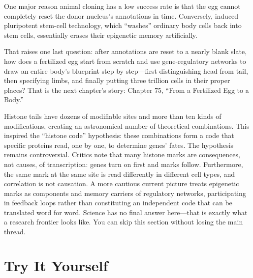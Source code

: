 One major reason animal cloning has a low success rate is that the egg cannot completely reset the donor nucleus's annotations in time. Conversely, induced pluripotent stem-cell technology, which ``washes'' ordinary body cells back into stem cells, essentially erases their epigenetic memory artificially.

That raises one last question: after annotations are reset to a nearly blank slate, how does a fertilized egg start from scratch and use gene-regulatory networks to draw an entire body's blueprint step by step---first distinguishing head from tail, then specifying limbs, and finally putting three trillion cells in their proper places? That is the next chapter's story: Chapter 75, ``From a Fertilized Egg to a Body.''

\begin{tiaozhan}
Histone tails have dozens of modifiable sites and more than ten kinds of modifications, creating an astronomical number of theoretical combinations. This inspired the ``histone code'' hypothesis: these combinations form a code that specific proteins read, one by one, to determine genes' fates. The hypothesis remains controversial. Critics note that many histone marks are consequences, not causes, of transcription: genes turn on first and marks follow. Furthermore, the same mark at the same site is read differently in different cell types, and correlation is not causation. A more cautious current picture treats epigenetic marks as components and memory carriers of regulatory networks, participating in feedback loops rather than constituting an independent code that can be translated word for word. Science has no final answer here---that is exactly what a research frontier looks like. You can skip this section without losing the main thread.
\end{tiaozhan}

\section*{Try It Yourself}

